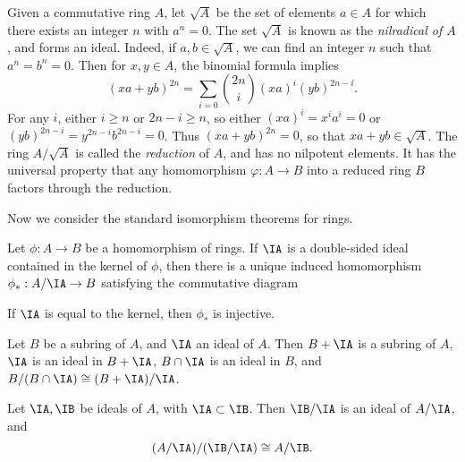 \begin{example}
    Given a commutative ring $A$, let $\sqrt{A}$ be the set of elements $a \in A$ for which there exists an integer $n$ with $a^n = 0$. The set $\sqrt{A}$ is known as the \emph{nilradical of $A$}, and forms an ideal. Indeed, if $a,b \in \sqrt{A}$, we can find an integer $n$ such that $a^n = b^n = 0$. Then for $x,y \in A$, the binomial formula implies
    \[ (xa + yb)^{2n} = \sum_{i = 0} \binom{2n}{i} (xa)^i (yb)^{2n-i}. \]
    For any $i$, either $i \geq n$ or $2n - i \geq n$, so either $(xa)^i = x^i a^i = 0$ or $(yb)^{2n-i} = y^{2n-i} b^{2n-i} = 0$. Thus $(xa + yb)^{2n} = 0$, so that $xa + yb \in \sqrt{A}$. The ring $A/\sqrt{A}$ is called the \emph{reduction} of $A$, and has no nilpotent elements. It has the universal property that any homomorphism $\varphi: A \to B$ into a reduced ring $B$ factors through the reduction.
\end{example}

Now we consider the standard isomorphism theorems for rings.

\begin{theorem}
    Let $\phi: A \to B$ be a homomorphism of rings. If $\IA$ is a double-sided ideal contained in the kernel of $\phi$, then there is a unique induced homomorphism $\phi_*: A/\IA \to B$ satisfying the commutative diagram
    \begin{center}
    \end{center}
    If $\IA$ is equal to the kernel, then $\phi_*$ is injective.
\end{theorem}

\begin{theorem}
    Let $B$ be a subring of $A$, and $\IA$ an ideal of $A$. Then $B + \IA$ is a subring of $A$, $\IA$ is an ideal in $B + \IA$, $B \cap \IA$ is an ideal in $B$, and $B/(B \cap \IA) \cong (B + \IA)/\IA$.
\end{theorem}

\begin{theorem}
    Let $\IA, \IB$ be ideals of $A$, with $\IA \subset \IB$. Then $\IB/\IA$ is an ideal of $A/\IA$, and
    \[ (A/\IA)/(\IB/\IA) \cong A/\IB. \]
\end{theorem}

